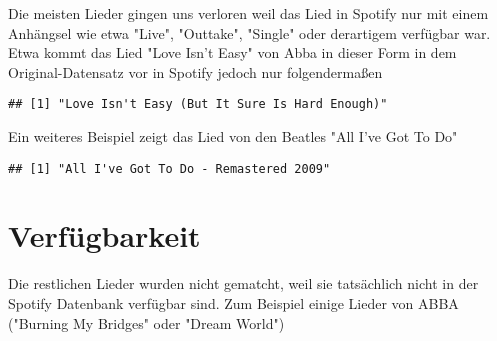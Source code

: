 \documentclass{article}\usepackage[]{graphicx}\usepackage[]{color}
\makeatletter
\newenvironment{kframe}{%
 \def\at@end@of@kframe{}%
 \ifinner\ifhmode%
  \def\at@end@of@kframe{\end{minipage}}%
  \begin{minipage}{\columnwidth}%
 \fi\fi%
 \def\FrameCommand##1{\hskip\@totalleftmargin \hskip-\fboxsep
 \colorbox{shadecolor}{##1}\hskip-\fboxsep
     \hskip-\linewidth \hskip-\@totalleftmargin \hskip\columnwidth}%
 \MakeFramed {\advance\hsize-\width
   \@totalleftmargin\z@ \linewidth\hsize
   \@setminipage}}%
 {\par\unskip\endMakeFramed%
 \at@end@of@kframe}
\newenvironment{knitrout}{}{} %
\makeatother
\begin{document}
Die meisten Lieder gingen uns verloren weil das Lied in Spotify nur mit einem Anhängsel wie etwa "Live", "Outtake", "Single" oder derartigem verfügbar war. \\
Etwa kommt das Lied "Love Isn't Easy" von Abba in dieser Form in dem Original-Datensatz vor in Spotify jedoch nur folgendermaßen

\begin{knitrout}
\color{fgcolor}\begin{kframe}
\begin{verbatim}
## [1] "Love Isn't Easy (But It Sure Is Hard Enough)"
\end{verbatim}
\end{kframe}
\end{knitrout}

Ein weiteres Beispiel zeigt das Lied von den Beatles "All I've Got To Do"

\begin{knitrout}
\color{fgcolor}\begin{kframe}
\begin{verbatim}
## [1] "All I've Got To Do - Remastered 2009"
\end{verbatim}
\end{kframe}
\end{knitrout}

\section*{Verfügbarkeit}

Die restlichen Lieder wurden nicht gematcht, weil sie tatsächlich nicht in der Spotify Datenbank verfügbar sind.
Zum Beispiel einige Lieder von ABBA ("Burning My Bridges" oder "Dream World")
\end{document}
